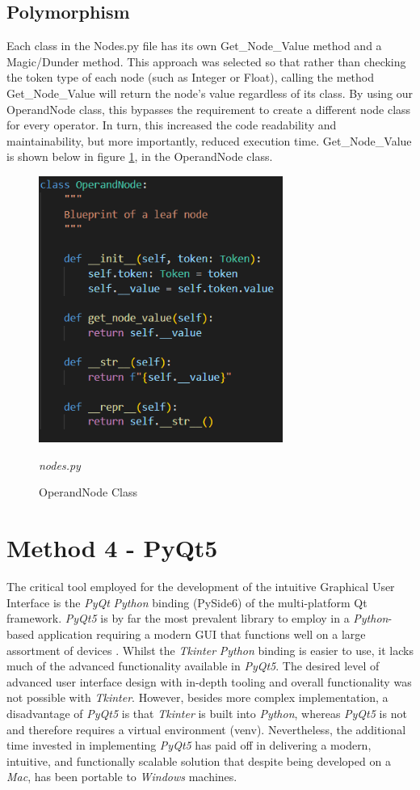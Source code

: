 \documentclass[a4paper, oneside, 11pt]{report}
\begin{document}
\newpage

\subsection{Polymorphism} 
Each class in the Nodes.py file has its own Get\_Node\_Value method and a Magic/Dunder method. This approach was selected so that rather than checking the token type of each node (such as Integer or Float), calling the method Get\_Node\_Value will return the node's value regardless of its class. By using our OperandNode class, this bypasses the requirement to create a different node class for every operator. In turn, this increased the code readability and maintainability, but more importantly, reduced execution time. Get\_Node\_Value is shown below in figure \ref{fig:operandnodeclass}, in the OperandNode class.

\begin{figure}[H]
    \centering
    \includegraphics[width=8cm]{MethodOverloading.png}
    \caption{OperandNode Class}
    \label{fig:operandnodeclass}
    \textit{nodes.py}
\end{figure}

\section{Method 4 - PyQt5}
The critical tool employed for the development of the intuitive Graphical User Interface is the \emph{PyQt} \emph{Python} binding (PySide6) of the multi-platform Qt framework. \emph{PyQt5} is by far the most prevalent library to employ in a \emph{Python}-based application requiring a modern GUI that functions well on a large assortment of devices \cite{qt2022}. Whilst the \emph{Tkinter} \emph{Python} binding is easier to use, it lacks much of the advanced functionality available in \emph{PyQt5}. The desired level of advanced user interface design with in-depth tooling and overall functionality was not possible with \emph{Tkinter}. However, besides more complex implementation, a disadvantage of \emph{PyQt5} is that \emph{Tkinter} is built into \emph{Python}, whereas \emph{PyQt5} is not and therefore requires a virtual environment (venv). Nevertheless, the additional time invested in implementing \emph{PyQt5} has paid off in delivering a modern, intuitive, and functionally scalable solution that despite being developed on a \emph{Mac}, has been portable to \emph{Windows} machines. 
\end{document}

